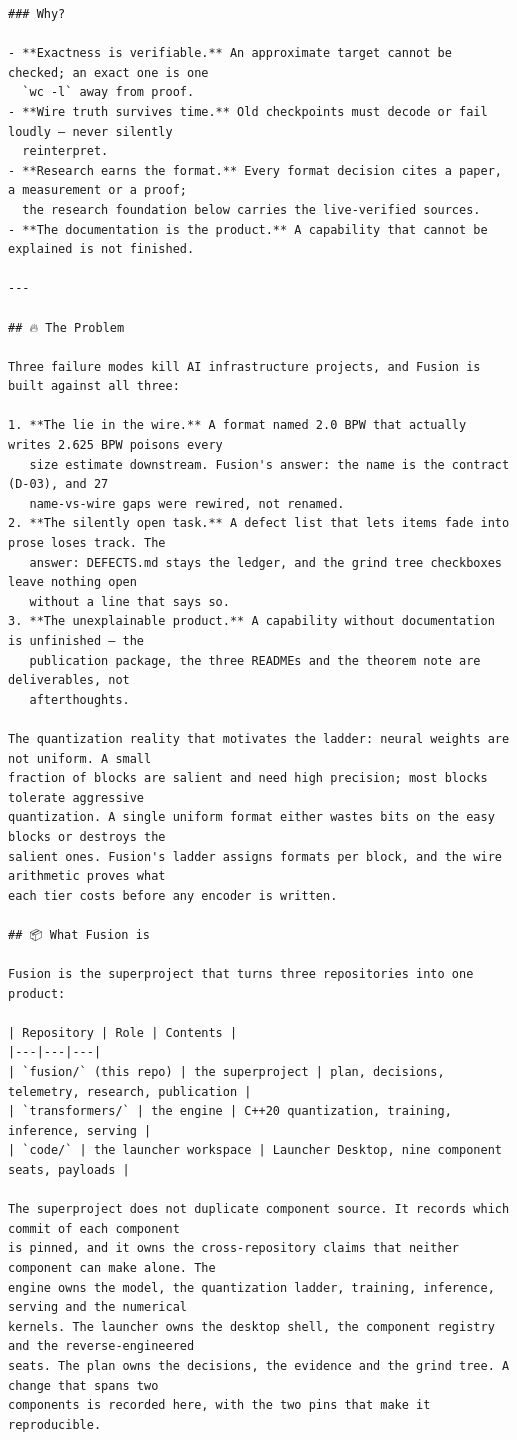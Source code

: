 \begin{Verbatim}[breaklines,breakanywhere,fontsize=\footnotesize]
### Why?

- **Exactness is verifiable.** An approximate target cannot be checked; an exact one is one
  `wc -l` away from proof.
- **Wire truth survives time.** Old checkpoints must decode or fail loudly — never silently
  reinterpret.
- **Research earns the format.** Every format decision cites a paper, a measurement or a proof;
  the research foundation below carries the live-verified sources.
- **The documentation is the product.** A capability that cannot be explained is not finished.

---

## 🔥 The Problem

Three failure modes kill AI infrastructure projects, and Fusion is built against all three:

1. **The lie in the wire.** A format named 2.0 BPW that actually writes 2.625 BPW poisons every
   size estimate downstream. Fusion's answer: the name is the contract (D-03), and 27
   name-vs-wire gaps were rewired, not renamed.
2. **The silently open task.** A defect list that lets items fade into prose loses track. The
   answer: DEFECTS.md stays the ledger, and the grind tree checkboxes leave nothing open
   without a line that says so.
3. **The unexplainable product.** A capability without documentation is unfinished — the
   publication package, the three READMEs and the theorem note are deliverables, not
   afterthoughts.

The quantization reality that motivates the ladder: neural weights are not uniform. A small
fraction of blocks are salient and need high precision; most blocks tolerate aggressive
quantization. A single uniform format either wastes bits on the easy blocks or destroys the
salient ones. Fusion's ladder assigns formats per block, and the wire arithmetic proves what
each tier costs before any encoder is written.

## 📦 What Fusion is

Fusion is the superproject that turns three repositories into one product:

| Repository | Role | Contents |
|---|---|---|
| `fusion/` (this repo) | the superproject | plan, decisions, telemetry, research, publication |
| `transformers/` | the engine | C++20 quantization, training, inference, serving |
| `code/` | the launcher workspace | Launcher Desktop, nine component seats, payloads |

The superproject does not duplicate component source. It records which commit of each component
is pinned, and it owns the cross-repository claims that neither component can make alone. The
engine owns the model, the quantization ladder, training, inference, serving and the numerical
kernels. The launcher owns the desktop shell, the component registry and the reverse-engineered
seats. The plan owns the decisions, the evidence and the grind tree. A change that spans two
components is recorded here, with the two pins that make it reproducible.


\end{Verbatim}
